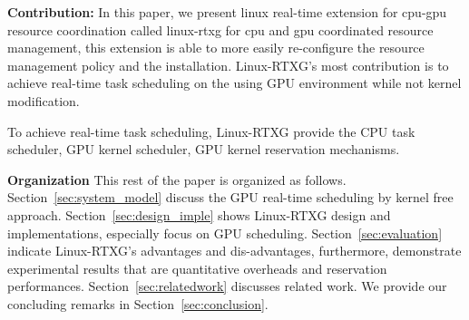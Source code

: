 \textbf{Contribution:}
In this paper, we present linux real-time extension for cpu-gpu resource coordination called linux-rtxg for cpu and gpu coordinated resource management, this extension is able to more easily re-configure the resource management policy and the installation.
Linux-RTXG's most contribution is to achieve real-time task scheduling on the using GPU environment while not kernel modification.

To achieve real-time task scheduling, 
Linux-RTXG provide the CPU task scheduler, GPU kernel scheduler, GPU kernel reservation mechanisms.

\textbf{Organization}
This rest of the paper is organized as follows.
Section~\ref{sec:system_model} discuss the GPU real-time scheduling by kernel free approach.
Section~\ref{sec:design_imple} shows Linux-RTXG design and implementations, especially focus on GPU scheduling.
Section~\ref{sec:evaluation} indicate Linux-RTXG's advantages and dis-advantages,
furthermore, demonstrate experimental results that are quantitative overheads and reservation performances.
Section~\ref{sec:relatedwork} discusses related work.
We provide our concluding remarks in Section~\ref{sec:conclusion}.
